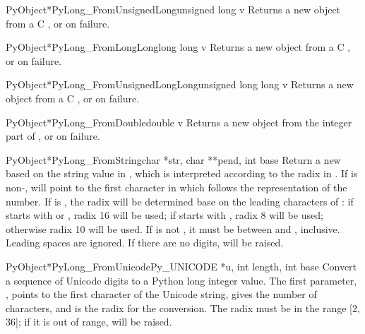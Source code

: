 \begin{cfuncdesc}{PyObject*}{PyLong_FromUnsignedLong}{unsigned long v}
  Returns a new  object from a C , or \NULL{} on failure.
\end{cfuncdesc}

\begin{cfuncdesc}{PyObject*}{PyLong_FromLongLong}{long long v}
  Returns a new  object from a C ,
  or \NULL{} on failure.
\end{cfuncdesc}

\begin{cfuncdesc}{PyObject*}{PyLong_FromUnsignedLongLong}{unsigned long long v}
  Returns a new  object from a C , or \NULL{} on failure.
\end{cfuncdesc}

\begin{cfuncdesc}{PyObject*}{PyLong_FromDouble}{double v}
  Returns a new  object from the integer part of
  , or \NULL{} on failure.
\end{cfuncdesc}

\begin{cfuncdesc}{PyObject*}{PyLong_FromString}{char *str, char **pend,
                                                int base}
  Return a new  based on the string value in
  , which is interpreted according to the radix in
  .  If  is non-\NULL,  will
  point to the first character in  which follows the
  representation of the number.  If  is , the radix
  will be determined base on the leading characters of : if
   starts with  or , radix 16 will be
  used; if  starts with , radix 8 will be used;
  otherwise radix 10 will be used.  If  is not , it
  must be between  and , inclusive.  Leading spaces
  are ignored.  If there are no digits,  will be
  raised.
\end{cfuncdesc}

\begin{cfuncdesc}{PyObject*}{PyLong_FromUnicode}{Py_UNICODE *u,
                                                 int length, int base}
  Convert a sequence of Unicode digits to a Python long integer
  value.  The first parameter, , points to the first character
  of the Unicode string,  gives the number of characters,
  and  is the radix for the conversion.  The radix must be
  in the range [2, 36]; if it is out of range, 
  will be raised.
\end{cfuncdesc}

